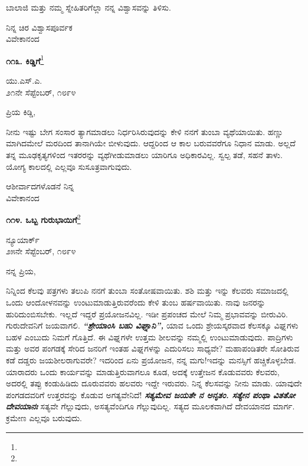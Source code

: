 ಬಾಲಾಜಿ ಮತ್ತು ನಮ್ಮ ಸ್ನೇಹಿತರಿಗೆಲ್ಲಾ ನನ್ನ ವಿಶ್ವಾಸವನ್ನು ತಿಳಿಸು.

{\flushright
ನಿನ್ನ ಚಿರ ವಿಶ್ವಾಸಪೂರ್ವಕ\\ವಿವೇಕಾನಂದ\par}

\begin{center}
\textbf{೧೧೩. ಕಿಡ್ಡಿಗೆ}\footnote{}
\end{center}

\vspace{-0.7cm}

\begin{flushright}
ಯು.ಎಸ್.ಎ.\\೨೧ನೇ ಸೆಪ್ಟೆಂಬರ್, ೧೮೯೪
\end{flushright}

\vspace{-0.7cm}

\noindent
ಪ್ರಿಯ ಕಿಡ್ಡಿ,

ನೀನು ಇಷ್ಟು ಬೇಗ ಸಂಸಾರ ತ್ಯಾಗಮಾಡಲು ನಿರ್ಧರಿಸಿರುವುದನ್ನು ಕೇಳಿ ನನಗೆ ತುಂಬಾ ವ್ಯಥೆಯಾಯಿತು. ಹಣ್ಣು ಮಾಗಿದಮೇಲೆ ಮರದಿಂದ ತಾನಾಗಿಯೇ ಬೀಳುವುದು. ಆದ್ದರಿಂದ ಆ ಕಾಲ ಬರುವವರೆಗೂ ನಿಧಾನ ಮಾಡು. ಅಲ್ಲದೆ ತನ್ನ ಮೂಢಕೃತ್ಯಗಳಿಂದ ಇತರರನ್ನು ವ್ಯಥೆಗೀಡುಮಾಡಲು ಯಾರಿಗೂ ಅಧಿಕಾರವಿಲ್ಲ. ಸ್ವಲ್ಪ ತಡೆ, ಸಹನೆ ತಾಳು. ಯೋಗ್ಯ ಕಾಲದಲ್ಲಿ ಎಲ್ಲವೂ ಸುಸೂತ್ರವಾಗುವುದು.

\vspace{-0.3cm}

{\flushright
ಆಶೀರ್ವಾದಗಳೊಡನೆ ನಿನ್ನ\\ವಿವೇಕಾನಂದ\par}

\begin{center}
\textbf{೧೧೪. ಒಬ್ಬ ಗುರುಭಾಯಿಗೆ}\footnote{}
\end{center}

\vspace{-0.7cm}

\begin{flushright}
ನ್ಯೂಯಾರ್ಕ್\\೨೫ನೇ ಸೆಪ್ಟೆಂಬರ್, ೧೮೯೪
\end{flushright}

\vspace{-0.7cm}

\noindent
ನನ್ನ ಪ್ರಿಯ,

ನಿನ್ನಿಂದ ಕೆಲವು ಪತ್ರಗಳು ತಲುಪಿ ನನಗೆ ತುಂಬಾ ಸಂತೋಷವಾಯಿತು. ಶಶಿ ಮತ್ತು ಇನ್ನು ಕೆಲವರು ಸಮಾಜದಲ್ಲಿ ಒಂದು ಆಂದೋಳನವನ್ನು ಉಂಟುಮಾಡುತ್ತಿರುವರೆಂದು ಕೇಳಿ ತುಂಬ ಹರ್ಷವಾಯಿತು. ನಾವು ಜನರನ್ನು ಹುರಿದುಂಬಿಸಬೇಕು. ಇಲ್ಲದೆ ಇದ್ದರೆ ಪ್ರಯೋಜನವಿಲ್ಲ. ಇಡೀ ಪ್ರಪಂಚದ ಮೇಲೆ ನಿಮ್ಮ ಪ್ರಭಾವವನ್ನು ಬೀರುವಿರಿ. ಗುರುದೇವನಿಗೆ ಜಯವಾಗಲಿ. \textbf{\textit{ “ಶ್ರೇಯಾಂಸಿ ಬಹು ವಿಘ್ನಾನಿ”, }} ಯಾವ ಒಂದು ಶ್ರೇಯಸ್ಕರವಾದ ಕೆಲಸಕ್ಕೂ ವಿಘ್ನಗಳು ಬಹಳ ಎಂಬುದು ನಿಮಗೆ ಗೊತ್ತಿದೆ. ಈ ವಿಘ್ನಗಳೇ ಉತ್ತಮ ಶೀಲವನ್ನು ನಮ್ಮಲ್ಲಿ ಉಂಟುಮಾಡುವುದು. ಪಾದ್ರಿಗಳು ಮತ್ತು ಅವರ ಪಂಗಡಕ್ಕೆ ಸೇರಿದ ಜನರಿಗೆ ಇಂತಹ ವಿಘ್ನಗಳನ್ನು ಎದುರಿಸಲು ಸಾಧ್ಯವೇ? ಮಹಾಪಂಡಿತರೇ ಸೋತಿರುವ ಕಡೆ ದಡ್ಡರು ಜಯಶೀಲರಾಗುವರೇ? ಇದರಿಂದ ಏನು ಪ್ರಯೋಜನ, ನನ್ನ ಮಗು!ಇದನ್ನು ಮನಸ್ಸಿಗೆ ಹಚ್ಚಿಕೊಳ್ಳಬೇಡ. ಯಾರಾದರು ಒಂದು ಕಾರ್ಯವನ್ನು ಮಾಡುತ್ತಿರುವಾಗಲೂ ಕೂಡ, ಅದಕ್ಕೆ ಉತ್ತೇಜನ ಕೊಡುವವರು ಕೆಲವರು, ಅದರಲ್ಲಿ ತಪ್ಪು ಕಂಡುಹಿಡಿದು ದೂರುವವರು ಹಲವರು ಇದ್ದೇ ಇರುವರು. ನಿನ್ನ ಕೆಲಸವನ್ನು ನೀನು ಮಾಡು. ಯಾವುದೇ ಪಂಗಡದವರಿಗೆ ಉತ್ತರವನ್ನು ಕೊಡುವ ಅಗತ್ಯವೇನಿದೆ! \textbf{\textit{ಸತ್ಯಮೇವ ಜಯತೇ ನ ಅನೃತಂ. ಸತ್ಯೇನ ಪಂಥಾ ವಿತತೋ ದೇವಯಾನಃ}} \enginline{-}ಸತ್ಯವೇ ಗೆಲ್ಲುವುದು, ಅಸತ್ಯವೆಂದಿಗೂ ಗೆಲ್ಲುವುದಿಲ್ಲ. ಸತ್ಯದ ಮೂಲಕವಾಗಿದೆ ದೇವಯಾನದ ಮಾರ್ಗ. ಕ್ರಮೇಣ ಎಲ್ಲವೂ ಬರುವುದು.


